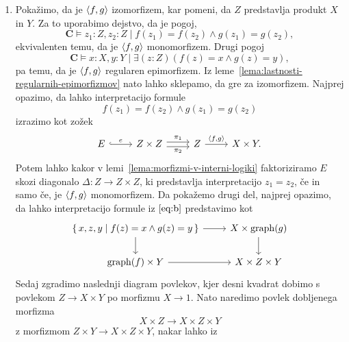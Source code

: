 \documentclass[../kategoricna_logika.tex]{subfiles}
\begin{document}
\begin{dokaz}
\begin{enumerate}[label=(\roman*)]
    \item Pokažimo, da je $\langle f,g \rangle$ izomorfizem, kar pomeni, da
      $Z$ predstavlja produkt $X$ in $Y$. Za to uporabimo dejstvo, da
      je pogoj,
      \begin{equation}
        \label{eq:a}
        \mathbf{C} \models z_1:Z,z_2:Z \mid f(z_{1}) = f(z_{2}) \land g(z_{1}) = g(z_{2}), 
      \end{equation}
      ekvivalenten temu, da je \( \langle f,g \rangle\) monomorfizem.  Drugi
      pogoj
      \begin{equation}
        \label{eq:b}
        \mathbf{C} \models x:X,y:Y \mid  \exists (z:Z)(f(z) = x \land g(z) = y),
      \end{equation}
      pa temu, da je \( \langle f,g \rangle\)
      regularen epimorfizem.  Iz leme~\ref{lema:lastnosti-regularnih-epimorfizmov}
      nato lahko
      sklepamo, da gre za izomorfizem.  Najprej opazimo, da lahko
      interpretacijo formule
      \[ f(z_{1}) = f(z_{2}) \land g(z_{1}) = g(z_{2})\] izrazimo kot
      zožek
      \begin{equation*}
        \begin{tikzcd}
          E \ar[r, hook, "e"] & Z \times Z \ar[r, shift left,
          "\pi_{1}"] \ar[r, shift right, "\pi_{2}"'] & Z \ar[r, ,
          "\fprod{f, g}"] & X \times Y.
        \end{tikzcd}
      \end{equation*}
      Potem lahko kakor v lemi~\ref{lema:morfizmi-v-interni-logiki} faktoriziramo $E$ skozi
      diagonalo $\Delta : Z \to Z \times Z$, ki predstavlja
      interpretacijo $z_{1} = z_{2}$, če in samo če, je $\langle f, g \rangle$
      monomorfizem.  Da pokažemo drugi del, najprej opazimo, da lahko
      interpretacijo formule iz $\eqref{eq:b}$ predstavimo kot
      \begin{equation}\label{diag:injektivnost-produkta}
        \begin{tikzcd}
          \set{x,z,y \mid f(z) = x \land g(z) = y} \ar[d] \ar[r] &
          X \times \mathrm{graph}(g) \ar[d] \\
          \mathrm{graph}(f) \times Y \ar[r] & X \times Z \times Y
        \end{tikzcd}
      \end{equation}
      Sedaj zgradimo naslednji diagram povlekov, kjer desni kvadrat
      dobimo s povlekom $Z \to X \times Y$ po morfizmu $X \to 1$. Nato
      naredimo povlek dobljenega morfizma
      \[X \times Z \to X \times Z \times Y\] z morfizmom
      $Z \times Y \to X \times Z \times Y$, nakar lahko iz

\end{enumerate}
\end{dokaz}
\end{document}
